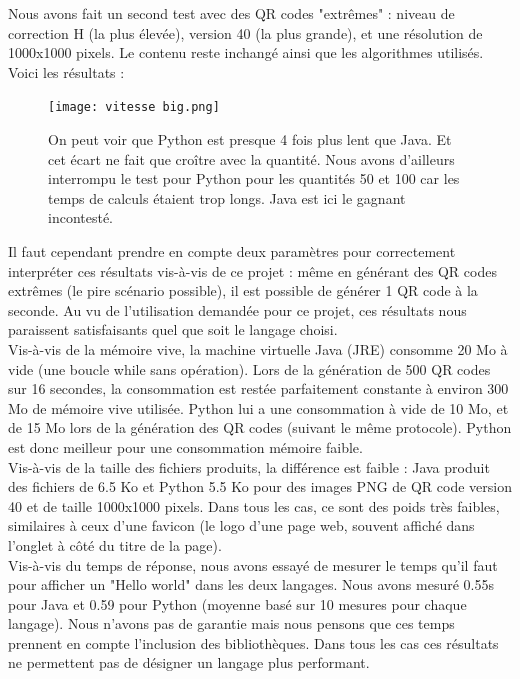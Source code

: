 \documentclass[a4paper,12pt]{article}
\begin{document}
\begin{itemize}
  Nous avons fait un second test avec des QR codes "extrêmes" : niveau de correction H (la plus élevée), version 40 (la plus grande), et une résolution de 1000x1000 pixels. Le contenu reste inchangé ainsi que les algorithmes utilisés. Voici les résultats : 
  
  
      \begin{figure}[H]
        \centering
        \texttt{[image: vitesse big.png]}
        \caption{On peut voir que Python est presque 4 fois plus lent que Java. Et cet écart ne fait que croître avec la quantité. Nous avons d'ailleurs interrompu le test pour Python pour les quantités 50 et 100 car les temps de calculs étaient trop longs. Java est ici le gagnant incontesté.}
    \end{figure}

    
  Il faut cependant prendre en compte deux paramètres pour correctement interpréter ces résultats vis-à-vis de ce projet : même en générant des QR codes extrêmes (le pire scénario possible), il est possible de générer 1 QR code à la seconde. Au vu de l'utilisation demandée pour ce projet, ces résultats nous paraissent satisfaisants quel que soit le langage choisi.\\
  
  Vis-à-vis de la mémoire vive, la machine virtuelle Java (JRE) consomme 20 Mo à vide (une boucle while sans opération). Lors de la génération de 500 QR codes sur 16 secondes, la consommation est restée parfaitement constante à environ 300 Mo de mémoire vive utilisée. Python lui a une consommation à vide de 10 Mo, et de 15 Mo lors de la génération des QR codes (suivant le même protocole). Python est donc meilleur pour une consommation mémoire faible.\\
    \newpage
  Vis-à-vis de la taille des fichiers produits, la différence est faible : Java produit des fichiers de 6.5 Ko et Python 5.5 Ko pour des images PNG de QR code version 40 et de taille 1000x1000 pixels. Dans tous les cas, ce sont des poids très faibles, similaires à ceux d'une favicon (le logo d'une page web, souvent affiché dans l'onglet à côté du titre de la page).\\
  
  Vis-à-vis du temps de réponse, nous avons essayé de mesurer le temps qu'il faut pour afficher un "Hello world" dans les deux langages. Nous avons mesuré 0.55s pour Java et 0.59 pour Python (moyenne basé sur 10 mesures pour chaque langage). Nous n'avons pas de garantie mais nous pensons que ces temps prennent en compte l'inclusion des bibliothèques. Dans tous les cas ces résultats ne permettent pas de désigner un langage plus performant.\\
  

\end{itemize}
\end{document}
